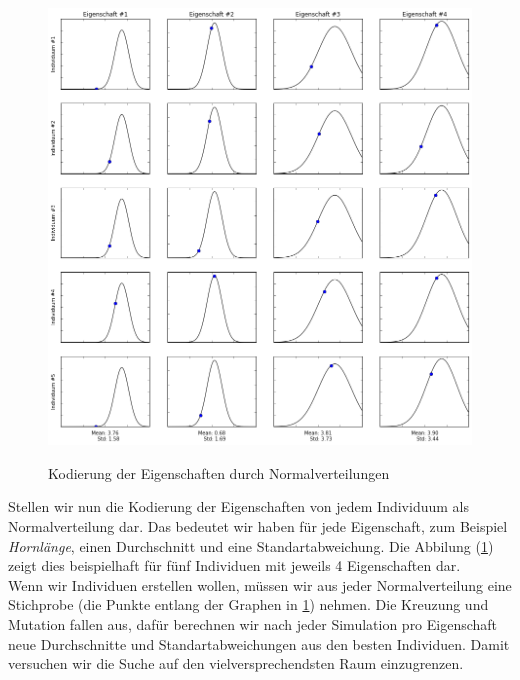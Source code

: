             \begin{figure}[H]
                    \begin{center}
                        \includegraphics[scale=0.47]{../pictures/diagrams/cross-entropy-visualization-ga.png}\\
                        \caption{Kodierung der Eigenschaften durch Normalverteilungen}\label{fig:norm-dist-encoding}
                    \end{center}
            \end{figure}

            Stellen wir nun die Kodierung der Eigenschaften von jedem Individuum als Normalverteilung dar. Das bedeutet wir haben für jede Eigenschaft, zum Beispiel \textit{Hornlänge}, einen Durchschnitt und eine Standartabweichung. Die Abbilung (\ref{fig:norm-dist-encoding}) zeigt dies beispielhaft für fünf Individuen mit jeweils 4 Eigenschaften dar.\\[3mm]

            \newpage
            \noindent
            Wenn wir Individuen erstellen wollen, müssen wir aus jeder Normalverteilung eine Stichprobe (die Punkte entlang der Graphen in \ref{fig:norm-dist-encoding}) nehmen. Die Kreuzung und Mutation fallen aus, dafür berechnen wir nach jeder Simulation pro Eigenschaft neue Durchschnitte und Standartabweichungen aus den besten Individuen. Damit versuchen wir die Suche auf den vielversprechendsten Raum einzugrenzen.\\

